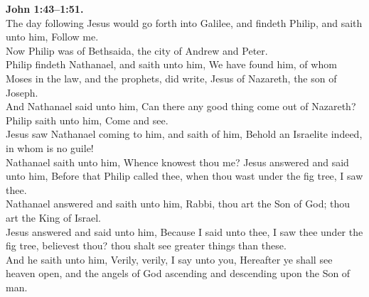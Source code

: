 \documentclass[10pt]{article} %
\begin{document}
{\begin{minipage}[t]{0.45\textwidth}
\textbf{John 1:43--1:51.}\\
The day following Jesus would go forth into Galilee, and findeth Philip, and saith unto him, Follow me.\\
Now Philip was of Bethsaida, the city of Andrew and Peter.\\
Philip findeth Nathanael, and saith unto him, We have found him, of whom Moses in the law, and the prophets, did write, Jesus of Nazareth, the son of Joseph.\\
And Nathanael said unto him, Can there any good thing come out of Nazareth? Philip saith unto him, Come and see.\\
Jesus saw Nathanael coming to him, and saith of him, Behold an Israelite indeed, in whom is no guile!\\
Nathanael saith unto him, Whence knowest thou me? Jesus answered and said unto him, Before that Philip called thee, when thou wast under the fig tree, I saw thee.\\
Nathanael answered and saith unto him, Rabbi, thou art the Son of God; thou art the King of Israel.\\
Jesus answered and said unto him, Because I said unto thee, I saw thee under the fig tree, believest thou? thou shalt see greater things than these.\\
And he saith unto him, Verily, verily, I say unto you, Hereafter ye shall see heaven open, and the angels of God ascending and descending upon the Son of man.\\

\end{minipage}}
\vspace*{\fill}
\newpage
\huge%
\vspace*{\fill}
\begin{spacing}{1.7}
\end{spacing}
\vspace*{\fill}
\end{document}
